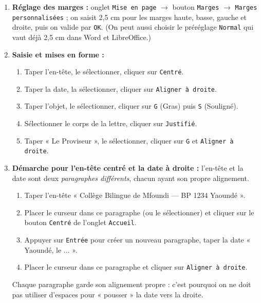 \documentclass[11pt]{article}
\begin{document}
\begin{corrige}
\begin{enumerate}
\item \textbf{Réglage des marges :} onglet \texttt{Mise en page} $\to$ bouton \texttt{Marges} $\to$ \texttt{Marges personnalisées} ; on saisit 2,5 cm pour les marges haute, basse, gauche et droite, puis on valide par \texttt{OK}. (On peut aussi choisir le préréglage \texttt{Normal} qui vaut déjà 2,5 cm dans Word et LibreOffice.)
\item \textbf{Saisie et mises en forme :}
\begin{enumerate}
\item Taper l'en-tête, le sélectionner, cliquer sur \texttt{Centré}.
\item Taper la date, la sélectionner, cliquer sur \texttt{Aligner à droite}.
\item Taper l'objet, le sélectionner, cliquer sur \texttt{G} (Gras) puis \texttt{S} (Souligné).
\item Sélectionner le corps de la lettre, cliquer sur \texttt{Justifié}.
\item Taper « Le Proviseur », le sélectionner, cliquer sur \texttt{G} et \texttt{Aligner à droite}.
\end{enumerate}
\item \textbf{Démarche pour l'en-tête centré et la date à droite :} l'en-tête et la date sont deux \emph{paragraphes différents}, chacun ayant son propre alignement.
\begin{enumerate}
\item Taper l'en-tête « Collège Bilingue de Mfoundi — BP 1234 Yaoundé ».
\item Placer le curseur dans ce paragraphe (ou le sélectionner) et cliquer sur le bouton \texttt{Centré} de l'onglet \texttt{Accueil}.
\item Appuyer sur \texttt{Entrée} pour créer un nouveau paragraphe, taper la date « Yaoundé, le ... ».
\item Placer le curseur dans ce paragraphe et cliquer sur \texttt{Aligner à droite}.
\end{enumerate}
Chaque paragraphe garde son alignement propre : c'est pourquoi on ne doit pas utiliser d'espaces pour « pousser » la date vers la droite.
\end{enumerate}
\end{corrige}
\end{document}
